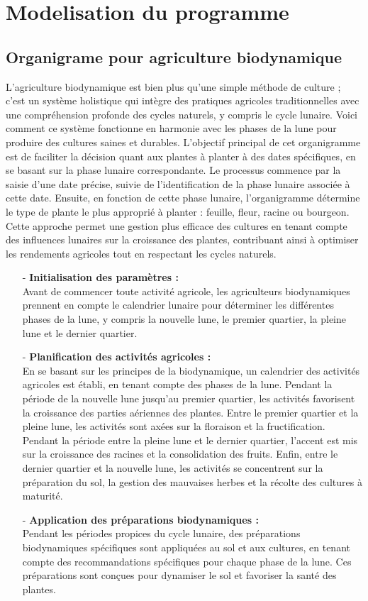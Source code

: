 \section{Modelisation du programme}
\subsection{Organigrame pour agriculture biodynamique }
L'agriculture biodynamique est bien plus qu'une simple méthode de culture ; c'est un système holistique qui intègre des pratiques agricoles traditionnelles avec une compréhension profonde des cycles naturels, y compris le cycle lunaire. Voici comment ce système fonctionne en harmonie avec les phases de la lune pour produire des cultures saines et durables.
L'objectif principal de cet organigramme est de faciliter la décision quant aux plantes à planter à des dates spécifiques, en se basant sur la phase lunaire correspondante. Le processus commence par la saisie d'une date précise, suivie de l'identification de la phase lunaire associée à cette date. Ensuite, en fonction de cette phase lunaire, l'organigramme détermine le type de plante le plus approprié à planter : feuille, fleur, racine ou bourgeon. Cette approche permet une gestion plus efficace des cultures en tenant compte des influences lunaires sur la croissance des plantes, contribuant ainsi à optimiser les rendements agricoles tout en respectant les cycles naturels.
\begin{itemize} 
\item[-] \textbf{Initialisation des paramètres :}\\
Avant de commencer toute activité agricole, les agriculteurs biodynamiques prennent en compte le calendrier lunaire pour déterminer les différentes phases de la lune, y compris la nouvelle lune, le premier quartier, la pleine lune et le dernier quartier.
\item[-] \textbf{Planification des activités agricoles :}\\
 En se basant sur les principes de la biodynamique, un calendrier des activités agricoles est établi, en tenant compte des phases de la lune. Pendant la période de la nouvelle lune jusqu'au premier quartier, les activités favorisent la croissance des parties aériennes des plantes. Entre le premier quartier et la pleine lune, les activités sont axées sur la floraison et la fructification. Pendant la période entre la pleine lune et le dernier quartier, l'accent est mis sur la croissance des racines et la consolidation des fruits. Enfin, entre le dernier quartier et la nouvelle lune, les activités se concentrent sur la préparation du sol, la gestion des mauvaises herbes et la récolte des cultures à maturité.
\item[-] \textbf{ Application des préparations biodynamiques :}\\
Pendant les périodes propices du cycle lunaire, des préparations biodynamiques spécifiques sont appliquées au sol et aux cultures, en tenant compte des recommandations spécifiques pour chaque phase de la lune. Ces préparations sont conçues pour dynamiser le sol et favoriser la santé des plantes.
\end{itemize}
